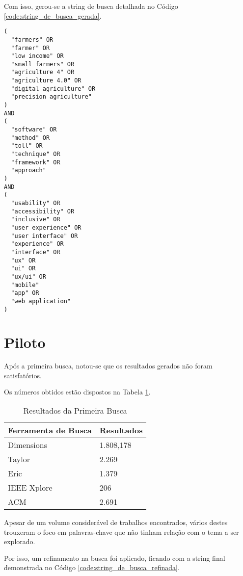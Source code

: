 \documentclass[12pt]{article}
\begin{document}
\noindent Com isso, gerou-se a string de busca detalhada no Código \ref{code:string_de_busca_gerada}.

\begin{lstlisting}[caption={String de Busca Gerada},captionpos=b,frame=single,label={code:string_de_busca_gerada}]
(
  "farmers" OR 
  "farmer" OR 
  "low income" OR 
  "small farmers" OR 
  "agriculture 4" OR 
  "agriculture 4.0" OR
  "digital agriculture" OR 
  "precision agriculture"
)
AND
(
  "software" OR
  "method" OR
  "toll" OR
  "technique" OR
  "framework" OR
  "approach"
)
AND
(
  "usability" OR
  "accessibility" OR
  "inclusive" OR
  "user experience" OR
  "user interface" OR
  "experience" OR
  "interface" OR
  "ux" OR
  "ui" OR
  "ux/ui" OR
  "mobile"
  "app" OR 
  "web application"
)
\end{lstlisting}

\section{Piloto}

Após a primeira busca, notou-se que os resultados gerados não foram satisfatórios.

Os números obtidos estão dispostos na Tabela \ref{tab:resultados_primeira_busca}.

\begin{table}[!htb]
  \centering
	\begin{tabular}{|l|l|}
		\hline
		\textbf{Ferramenta de Busca} & \textbf{Resultados} \\ \hline
		Dimensions                   & 1.808,178           \\ \hline
		Taylor                       & 2.269               \\ \hline
		Eric                         & 1.379               \\ \hline
		IEEE Xplore                  & 206                 \\ \hline
		ACM                          & 2.691               \\ \hline
		\end{tabular}
  \caption{Resultados da Primeira Busca}
  \label{tab:resultados_primeira_busca}
\end{table}

Apesar de um volume considerável de trabalhos encontrados, vários destes trouxeram o foco em palavras-chave que não tinham relação com o tema a ser explorado.

Por isso, um refinamento na busca foi aplicado, ficando com a string final demonstrada no Código \ref{code:string_de_busca_refinada}.
\end{document}
